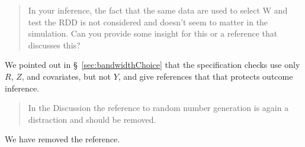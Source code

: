 \documentclass[12pt]{article}
\begin{document}
\begin{quote}
In your inference, the fact that the same data are used to select W
and test the RDD is not considered and doesn’t seem to matter in the
simulation. Can you provide some insight for this or a reference that
discusses this?
\end{quote}
We pointed out in \S~\ref{sec:bandwidthChoice} that the specification
checks use only $R$, $Z$, and covariates, but not $Y$, and give
references that that protects outcome inference.

\begin{quote}
In the Discussion the reference to random number generation is again a
distraction and should be removed.
\end{quote}
We have removed the reference.
\end{document}
